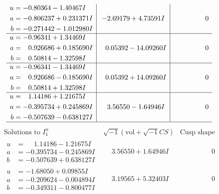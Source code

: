 \documentclass[1p]{elsarticle_modified}
\theoremstyle{definition}
\newcommand{\I}{\sqrt{-1}}
\begin{document}
$$\begin{array}{c|c|c}
\begin{aligned}
u &= -0.80364 - 1.40467 I \\
a &= -0.806237 + 0.231371 I \\
b &= -0.271442 - 1.012980 I\end{aligned}
 & -2.69179 + 4.73591 I & \phantom{-0.000000 } 0 \\ \hline\begin{aligned}
u &= -0.96341 + 1.34469 I \\
a &= \phantom{-}0.926686 + 0.185690 I \\
b &= \phantom{-}0.50814 - 1.32598 I\end{aligned}
 & \phantom{-}0.05392 - 14.09260 I & \phantom{-0.000000 } 0 \\ \hline\begin{aligned}
u &= -0.96341 - 1.34469 I \\
a &= \phantom{-}0.926686 - 0.185690 I \\
b &= \phantom{-}0.50814 + 1.32598 I\end{aligned}
 & \phantom{-}0.05392 + 14.09260 I & \phantom{-0.000000 } 0 \\ \hline\begin{aligned}
u &= \phantom{-}1.14186 + 1.21675 I \\
a &= -0.395734 + 0.245869 I \\
b &= -0.507639 - 0.638127 I\end{aligned}
 & \phantom{-}3.56550 - 1.64946 I & \phantom{-0.000000 } 0\\
 \hline 
 \end{array}$$\newpage$$\begin{array}{c|c|c}  
\text{Solutions to }I^u_{1}& \I (\text{vol} + \sqrt{-1}CS) & \text{Cusp shape}\\
 \hline 
\begin{aligned}
u &= \phantom{-}1.14186 - 1.21675 I \\
a &= -0.395734 - 0.245869 I \\
b &= -0.507639 + 0.638127 I\end{aligned}
 & \phantom{-}3.56550 + 1.64946 I & \phantom{-0.000000 } 0 \\ \hline\begin{aligned}
u &= -1.68050 + 0.09855 I \\
a &= -0.209624 - 0.004894 I \\
b &= -0.349311 - 0.800477 I\end{aligned}
 & \phantom{-}3.19565 + 5.32403 I & \phantom{-0.000000 } 0 \\ \hline\begin{aligned}

\end{aligned}
\end{array}$$
\end{document}
